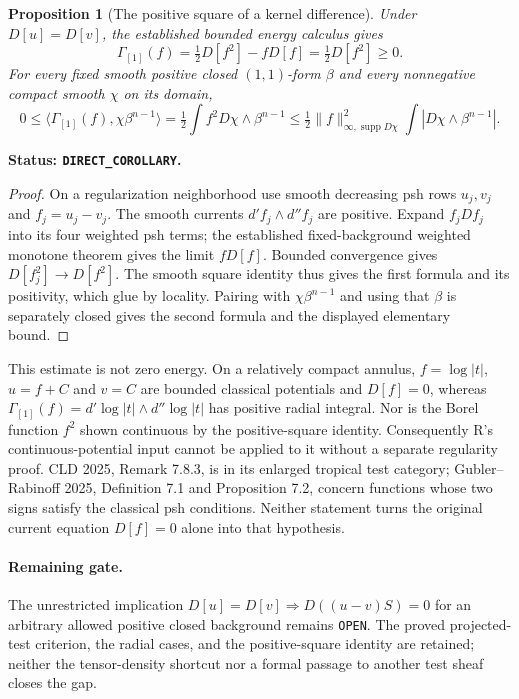 \documentclass[11pt,a4paper]{article}
\numberwithin{equation}{section}
\newtheorem{proposition}[theorem]{Proposition}
\theoremstyle{definition}
\theoremstyle{remark}
\begin{document}
\begin{proposition}[The positive square of a kernel difference]
\label{prop:r3-kernel-positive-square}
Under $D[u]=D[v]$, the established bounded energy calculus gives
\begin{equation}\label{eq:r3-kernel-positive-square}
 \Gamma_{[1]}(f)
       =\tfrac12D[f^2]-fD[f]
       =\tfrac12D[f^2]\geq0.
\end{equation}
For every fixed smooth positive closed $(1,1)$-form $\beta$ and
every nonnegative compact smooth $\chi$ on its domain,
\[
 0\leq\langle\Gamma_{[1]}(f),\chi\beta^{n-1}\rangle
  =\tfrac12\int f^2D\chi\wedge\beta^{n-1}
  \leq\tfrac12\|f\|_{\infty,\operatorname{supp}D\chi}^2
                 \int|D\chi\wedge\beta^{n-1}|.
\]
\end{proposition}

\noindent\textbf{Status: \texttt{DIRECT\_COROLLARY}.}

\begin{proof}
On a regularization neighborhood use smooth decreasing psh rows
$u_j,v_j$ and $f_j=u_j-v_j$. The smooth currents
$d'f_j\wedge d''f_j$ are positive. Expand $f_jDf_j$ into its
four weighted psh terms; the established fixed-background weighted
monotone theorem gives the limit $fD[f]$. Bounded convergence gives
$D[f_j^2]\to D[f^2]$. The smooth square identity thus gives the
first formula and its positivity, which glue by locality. Pairing
with $\chi\beta^{n-1}$ and using that $\beta$ is separately closed
gives the second formula and the displayed elementary bound.
\end{proof}

This estimate is not zero energy. On a relatively compact annulus,
$f=\log|t|$, $u=f+C$ and $v=C$ are bounded classical potentials
and $D[f]=0$, whereas
$\Gamma_{[1]}(f)=d'\log|t|\wedge d''\log|t|$ has positive radial
integral. Nor is the Borel function $f^2$ shown continuous by the
positive-square identity. Consequently R's continuous-potential
input cannot be applied to it without a separate regularity proof.
CLD 2025, Remark 7.8.3, is in its enlarged tropical test category;
Gubler--Rabinoff 2025, Definition 7.1 and Proposition 7.2, concern
functions whose two signs satisfy the classical psh conditions.
Neither statement turns the original current equation $D[f]=0$
alone into that hypothesis.

\paragraph{Remaining gate.}
The unrestricted implication
$D[u]=D[v]\Rightarrow D((u-v)S)=0$ for an arbitrary allowed
positive closed background remains \texttt{OPEN}. The proved
projected-test criterion, the radial cases, and the positive-square
identity are retained; neither the tensor-density shortcut nor a
formal passage to another test sheaf closes the gap.
\end{document}
